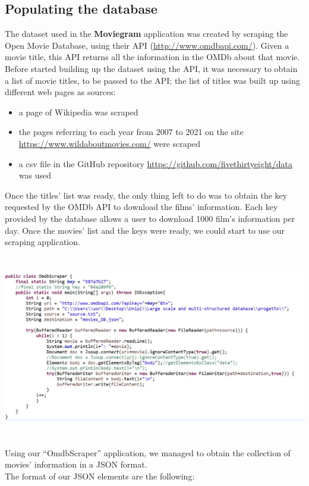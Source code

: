 \documentclass[a4paper, oneside]{article}
\begin{document}
\subsection{Populating the database}
The dataset used in the \textbf{Moviegram} application was created by scraping the Open Movie Database, using their API (\url{http://www.omdbapi.com/}). Given a movie title, this API returns all the information in the OMDb about that movie. Before started building up the dataset using the API, it was necessary to obtain a list of movie titles, to be passed to the API; the list of titles was built up using different web pages as sources:
\begin{itemize}
\item a page of Wikipedia was scraped
\item the pages referring to each year from 2007 to 2021 on the site \url{https://www.wildaboutmovies.com/} were scraped
\item a csv file in the GitHub repository \url{https://github.com/fivethirtyeight/data} was used
\end{itemize}
Once the titles’ list was ready, the only thing left to do was to obtain the key requested by the OMDb API to download the films’ information. Each key provided by the database allows a user to download 1000 film’s information per day. Once the movies’ list and the keys were ready, we could start to use our scraping application.\\

\begin{minipage}{\linewidth}
\begin{center}
\vspace{1mm}
\includegraphics[height = 80mm]{./images/screens/OMDBScraperScreen.jpg} 
\vspace{6mm}
\label{fig:OMDBScraper}
\vspace{4mm}
\end{center}
\end{minipage}
Using our “OmdbScraper” application, we managed to obtain the collection of movies’ information in a JSON format.\\ The format of our JSON elements are the following:\\
\end{document}
